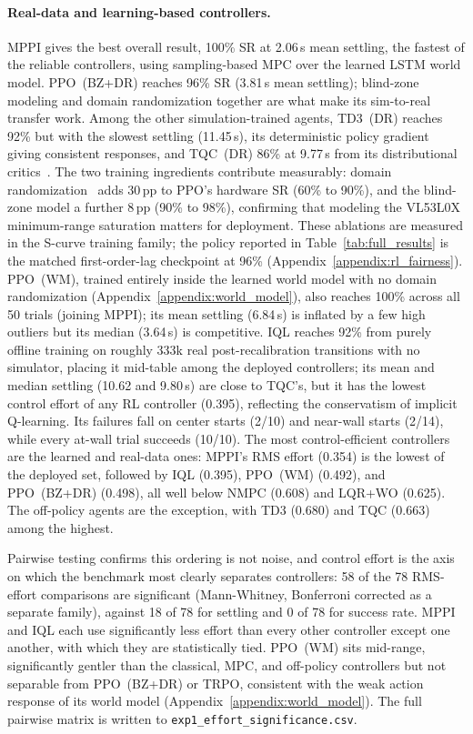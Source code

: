 \paragraph{Real-data and learning-based controllers.}
MPPI gives the best overall result, 100\% SR at 2.06\,s mean settling, the
fastest of the reliable controllers, using sampling-based MPC over the learned LSTM
world model. PPO~(BZ+DR) reaches 96\% SR (3.81\,s mean settling); blind-zone
modeling and domain randomization together are what make its sim-to-real
transfer work. Among the
other simulation-trained agents, TD3~(DR) reaches 92\% but with the slowest
settling (11.45\,s), its deterministic policy gradient~\cite{fujimoto2018td3}
giving consistent responses, and TQC~(DR) 86\% at 9.77\,s from its
distributional critics~\cite{kuznetsov2020controlling}. The two training
ingredients contribute measurably: domain randomization~\cite{tobin2017domain}
adds 30\,pp to PPO's hardware SR (60\% to 90\%), and the blind-zone model a
further 8\,pp (90\% to 98\%), confirming that modeling the VL53L0X
minimum-range saturation matters for deployment. These ablations are
measured in the S-curve training family; the policy reported in
Table~\ref{tab:full_results} is the matched first-order-lag checkpoint at
96\% (Appendix~\ref{appendix:rl_fairness}). PPO~(WM), trained entirely
inside the learned world model with no domain randomization
(Appendix~\ref{appendix:world_model}), also reaches 100\% across all
50 trials (joining MPPI); its mean settling (6.84\,s) is inflated by a few high outliers but
its median (3.64\,s) is competitive. IQL reaches 92\% from purely offline
training on roughly 333k real post-recalibration transitions with no
simulator, placing it mid-table among the deployed controllers; its mean
and median settling (10.62 and 9.80\,s) are close to TQC's, but it has the
lowest control effort of any RL controller (0.395), reflecting the
conservatism of implicit Q-learning. Its failures fall on center starts
(2/10) and near-wall starts (2/14), while every at-wall trial succeeds
(10/10). The most control-efficient
controllers are the learned and real-data ones: MPPI's RMS effort (0.354) is
the lowest of the deployed set, followed by IQL (0.395), PPO~(WM) (0.492), and
PPO~(BZ+DR) (0.498), all well below NMPC (0.608) and LQR+WO (0.625). The
off-policy agents are the exception, with TD3 (0.680) and TQC (0.663) among
the highest.

Pairwise testing confirms this ordering is not noise, and control effort is the
axis on which the benchmark most clearly separates controllers: 58 of the 78
RMS-effort comparisons are significant (Mann-Whitney, Bonferroni corrected as a
separate family), against 18 of 78 for settling and 0 of 78 for success rate.
MPPI and IQL each use significantly less effort than every other controller
except one another, with which they are statistically tied. PPO~(WM) sits
mid-range, significantly gentler than the classical, MPC, and off-policy
controllers but not separable from PPO~(BZ+DR) or TRPO, consistent with the
weak action response of its world model (Appendix~\ref{appendix:world_model}).
The full pairwise matrix is written to \texttt{exp1\_effort\_significance.csv}.
